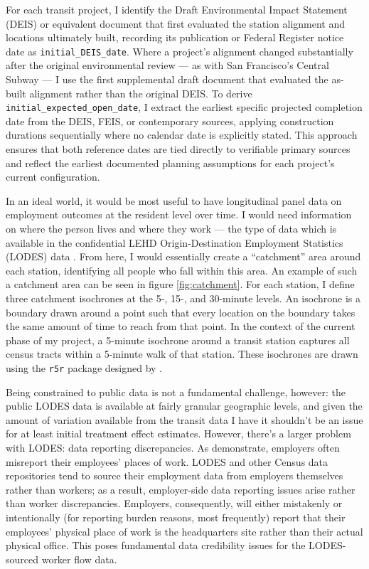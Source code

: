 \documentclass[12pt]{article}
\begin{document}
For each transit project, I identify the Draft Environmental Impact Statement (DEIS) or equivalent document that first evaluated the station alignment and locations ultimately built, recording its publication or Federal Register notice date as \texttt{initial\_DEIS\_date}. Where a project's alignment changed substantially after the original environmental review — as with San Francisco's Central Subway — I use the first supplemental draft document that evaluated the as-built alignment rather than the original DEIS. To derive \texttt{initial\_expected\_open\_date}, I extract the earliest specific projected completion date from the DEIS, FEIS, or contemporary sources, applying construction durations sequentially where no calendar date is explicitly stated. This approach ensures that both reference dates are tied directly to verifiable primary sources and reflect the earliest documented planning assumptions for each project's current configuration.

In an ideal world, it would be most useful to have longitudinal panel data on employment outcomes at the resident level over time. I would need information on where the person lives and where they work --- the type of data which is available in the confidential LEHD Origin-Destination Employment Statistics (LODES) data \parencite{census_lodes}. From here, I would essentially create a ``catchment'' area around each station, identifying all people who fall within this area. An example of such a catchment area can be seen in figure \ref{fig:catchment}. For each station, I define three catchment isochrones at the 5-, 15-, and 30-minute levels. An isochrone is a boundary drawn around a point such that every location on the boundary takes the same amount of time to reach from that point. In the context of the current phase of my project, a 5-minute isochrone around a transit station captures all census tracts within a 5-minute walk of that station. These isochrones are drawn using the \texttt{r5r} package designed by \textcite{r5r}. 

Being constrained to public data is not a fundamental challenge, however: the public LODES data is available at fairly granular geographic levels, and given the amount of variation available from the transit data I have it shouldn't be an issue for at least initial treatment effect estimates. However, there's a larger problem with LODES: data reporting discrepancies. As \textcite{abrahamExploringDifferencesEmployment2013} demonstrate, employers often misreport their employees' places of work. LODES and other Census data repositories tend to source their employment data from employers themselves rather than workers; as a result, employer-side data reporting issues arise rather than worker discrepancies. Employers, consequently, will either mistakenly or intentionally (for reporting burden reasons, most frequently) report that their employees' physical place of work is the headquarters site rather than their actual physical office. This poses fundamental data credibility issues for the LODES-sourced worker flow data. 
\end{document}

